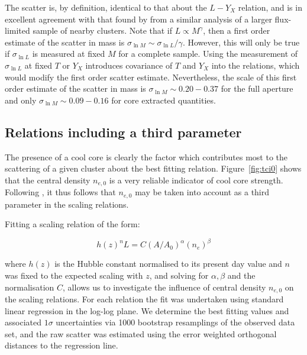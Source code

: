 \documentclass[oldversion]{aa}
\begin{document}
{The scatter is, by definition, identical to that about the $L-Y_X$ relation, and
is in excellent agreement with that found by \citet{vikh08} from a similar analysis of a larger flux-limited sample of nearby clusters. 
Note that if $L \propto M^\gamma$, then a first order estimate of the scatter in mass is $\sigma_{\ln{M}} \sim \sigma_{\ln{L}}/\gamma$. However, this will only be true if $\sigma_{\ln{L}}$ is measured at fixed $M$ for a complete sample. Using the measurement of $\sigma_{\ln{L}}$ at fixed $T$ or $Y_X$ introduces covariance of $T$ and $Y_X$ into the relations, which would modify the first order scatter estimate. Nevertheless, the scale of this first order estimate of the scatter in mass is $\sigma_{\ln{M}} \sim 0.20-0.37$ for the full aperture and only $\sigma_{\ln{M}} \sim 0.09-0.16$ for core extracted quantities}.


\subsection{Relations including a third parameter}

The presence of a cool core is clearly the factor which contributes
most to the scattering of a given cluster about the best fitting 
relation. Figure~\ref{fig:tci0} shows that
the central density $n_{e,0}$ is a very reliable indicator of cool core
strength. Following \citet{ohara06}, it thus follows that $n_{e,0}$ may be taken into account as a third parameter in the scaling relations. 

Fitting a scaling relation of the form:

\begin{equation}
h(z)^n L = C (A/A_0)^\alpha (n_e)^\beta
\end{equation}

\noindent where $h(z)$ is the Hubble constant normalised to its present day value and $n$ was fixed to the expected scaling with $z$, and solving for $\alpha, \beta$ and the normalisation $C$, allows us to investigate the influence of central density $n_{e,0}$ on the scaling relations. For each relation the  fit was undertaken using standard linear regression in the log-log plane. We determine the best fitting values and associated $1\sigma$ uncertainties via 1000 bootstrap resamplings of the observed data set, and the raw scatter was estimated using the error weighted orthogonal distances to the regression line.
\end{document}
